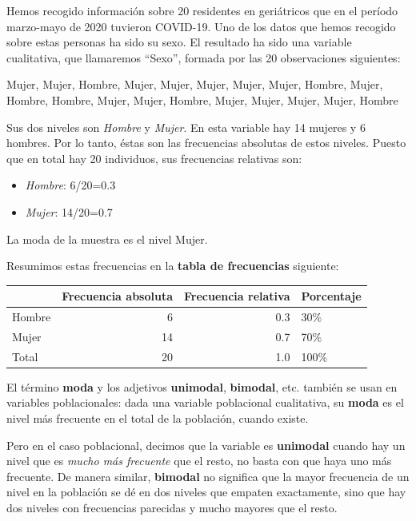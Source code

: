 \documentclass[
  spanish,
  letterpaper,
  DIV=11,
  numbers=noendperiod]{scrreprt}
\newenvironment{Shaded}{\begin{snugshade}}{\end{snugshade}}
\newcommand{\NormalTok}[1]{\textcolor[rgb]{0.00,0.23,0.31}{#1}}
\newcounter{none} %
\begin{document}
Hemos recogido información sobre 20 residentes en geriátricos que en el
período marzo-mayo de 2020 tuvieron COVID-19. Uno de los datos que hemos
recogido sobre estas personas ha sido su sexo. El resultado ha sido una
variable cualitativa, que llamaremos ``Sexo'', formada por las 20
observaciones siguientes:

\begin{Shaded}
\begin{Highlighting}[]
\NormalTok{Mujer,  Mujer,  Hombre,  Mujer,  Mujer,  Mujer,  Mujer,  Mujer,  Hombre, Mujer,}
\NormalTok{Hombre,  Hombre,  Mujer,  Mujer,  Hombre,  Mujer,  Mujer,  Mujer,  Mujer,  Hombre}
\end{Highlighting}
\end{Shaded}

Sus dos niveles son \emph{Hombre} y \emph{Mujer}. En esta variable hay
14 mujeres y 6 hombres. Por lo tanto, éstas son las frecuencias
absolutas de estos niveles. Puesto que en total hay 20 individuos, sus
frecuencias relativas son:

\begin{itemize}
\item
  \emph{Hombre}: 6/20=0.3
\item
  \emph{Mujer}: 14/20=0.7
\end{itemize}

La moda de la muestra es el nivel Mujer.

Resumimos estas frecuencias en la \textbf{tabla de frecuencias}
siguiente:

{\def\LTcaptype{none} %
\begin{longtable}[]{@{}lrrl@{}}
\toprule\noalign{}
& Frecuencia absoluta & Frecuencia relativa & Porcentaje \\
\midrule\noalign{}
\endhead
\bottomrule\noalign{}
\endlastfoot
Hombre & 6 & 0.3 & 30\% \\
Mujer & 14 & 0.7 & 70\% \\
Total & 20 & 1.0 & 100\% \\
\end{longtable}
}


El término \textbf{moda} y los adjetivos \textbf{unimodal},
\textbf{bimodal}, etc. también se usan en variables poblacionales: dada
una variable poblacional cualitativa, su \textbf{moda} es el nivel más
frecuente en el total de la población, cuando existe.

Pero en el caso poblacional, decimos que la variable es
\textbf{unimodal} cuando hay un nivel que es \emph{mucho más frecuente}
que el resto, no basta con que haya uno más frecuente. De manera
similar, \textbf{bimodal} no significa que la mayor frecuencia de un
nivel en la población se dé en dos niveles que empaten exactamente, sino
que hay dos niveles con frecuencias parecidas y mucho mayores que el
resto.
\end{document}
